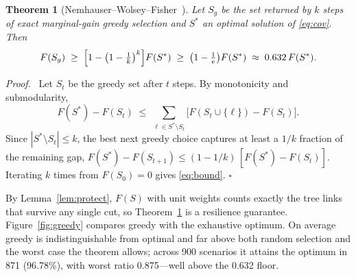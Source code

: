 \documentclass[10pt,a4paper]{article}
\newtheorem{theorem}{Theorem}
\newenvironment{proof}{\par\noindent\textit{Proof.}\ }{\hfill$\square$\par\medskip}
\begin{document}
\begin{theorem}[Nemhauser--Wolsey--Fisher~\cite{nemhauser}]\label{thm:greedy}
Let $S_g$ be the set returned by $k$ steps of exact marginal-gain greedy selection and $S^\ast$ an optimal solution of
\eqref{eq:cov}. Then
\begin{equation}\label{eq:bound}
  F(S_g)\;\ge\;\Bigl[1-\bigl(1-\tfrac1k\bigr)^{k}\Bigr]F(S^\ast)\;\ge\;\bigl(1-\tfrac1e\bigr)F(S^\ast)\;\approx\;0.632\,F(S^\ast).
\end{equation}
\end{theorem}
\begin{proof}
Let $S_t$ be the greedy set after $t$ steps. By monotonicity and submodularity,
\begin{equation}\label{eq:gap}
  F(S^\ast)-F(S_t)\;\le\;\sum_{\ell\in S^\ast\setminus S_t}\bigl[F(S_t\cup\{\ell\})-F(S_t)\bigr].
\end{equation}
Since $|S^\ast\setminus S_t|\le k$, the best next greedy choice captures at least a $1/k$ fraction of the remaining gap,
$F(S^\ast)-F(S_{t+1})\le(1-1/k)\,[F(S^\ast)-F(S_t)]$. Iterating $k$ times from $F(S_0)=0$ gives \eqref{eq:bound}.
\end{proof}

By Lemma~\ref{lem:protect}, $F(S)$ with unit weights counts exactly the tree links that survive any single cut, so
Theorem~\ref{thm:greedy} is a resilience guarantee. Figure~\ref{fig:greedy} compares greedy with the exhaustive optimum.
On average greedy is indistinguishable from optimal and far above both random selection and the worst case the theorem
allows; across 900 scenarios it attains the optimum in 871 (96.78\%), with worst ratio 0.875---well above the 0.632 floor.
\end{document}
